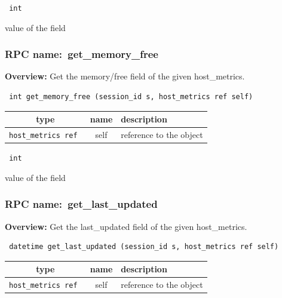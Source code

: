 \vspace{0.3cm}

{\tt 
int
}


value of the field
\vspace{0.3cm}
\vspace{0.3cm}
\vspace{0.3cm}
\subsubsection{RPC name:~get\_memory\_free}

{\bf Overview:} 
Get the memory/free field of the given host\_metrics.

\begin{verbatim} int get_memory_free (session_id s, host_metrics ref self)\end{verbatim}



 
\vspace{0.3cm}
\begin{tabular}{|c|c|p{7cm}|}
 \hline
{\bf type} & {\bf name} & {\bf description} \\ \hline
{\tt host\_metrics ref } & self & reference to the object \\ \hline 

\end{tabular}

\vspace{0.3cm}

{\tt 
int
}


value of the field
\vspace{0.3cm}
\vspace{0.3cm}
\vspace{0.3cm}
\subsubsection{RPC name:~get\_last\_updated}

{\bf Overview:} 
Get the last\_updated field of the given host\_metrics.

\begin{verbatim} datetime get_last_updated (session_id s, host_metrics ref self)\end{verbatim}



 
\vspace{0.3cm}
\begin{tabular}{|c|c|p{7cm}|}
 \hline
{\bf type} & {\bf name} & {\bf description} \\ \hline
{\tt host\_metrics ref } & self & reference to the object \\ \hline 

\end{tabular}

